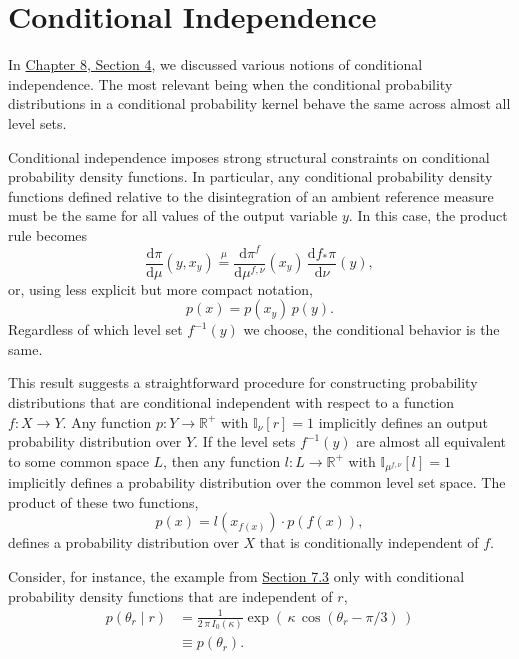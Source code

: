 \documentclass[
  letterpaper,
  DIV=11,
  numbers=noendperiod]{scrartcl}
\begin{document}
\section{Conditional Independence}\label{conditional-independence}

In
\href{http://www.symplectomorphic.com/assets/chapters_html/conditional_probability_theory.html\#sec:independence}{Chapter
8, Section 4}, we discussed various notions of conditional independence.
The most relevant being when the conditional probability distributions
in a conditional probability kernel behave the same across almost all
level sets.

Conditional independence imposes strong structural constraints on
conditional probability density functions. In particular, any
conditional probability density functions defined relative to the
disintegration of an ambient reference measure must be the same for all
values of the output variable \(y\). In this case, the product rule
becomes \[
\frac{ \mathrm{d}  \pi }{ \mathrm{d}  \mu  } (y, x_{y})
\overset{\mu}{=}
\frac{ \mathrm{d}  \pi^{f} }{ \mathrm{d}  \mu^{f, \nu}  } (x_{y}) \,
\frac{ \mathrm{d}  f_{*} \pi }{ \mathrm{d}  \nu  } (y),
\] or, using less explicit but more compact notation, \[
p(x) = p( x_{y} ) \, p(y).
\] Regardless of which level set \(f^{-1}(y)\) we choose, the
conditional behavior is the same.

This result suggests a straightforward procedure for constructing
probability distributions that are conditional independent with respect
to a function \(f : X \rightarrow Y\). Any function
\(p : Y \rightarrow \mathbb{R}^{+}\) with
\(\mathbb{I}_{\nu} \! \left[ r \right] = 1\) implicitly defines an
output probability distribution over \(Y\). If the level sets
\(f^{-1}(y)\) are almost all equivalent to some common space \(L\), then
any function \(l : L \rightarrow \mathbb{R}^{+}\) with
\(\mathbb{I}_{\mu^{f, \nu}} \! \left[ l \right] = 1\) implicitly defines
a probability distribution over the common level set space. The product
of these two functions, \[
p(x) = l( x_{f(x)} ) \cdot p( f(x) ),
\] defines a probability distribution over \(X\) that is conditionally
independent of \(f\).

Consider, for instance, the example from \hyperref[sec:build-ex]{Section
7.3} only with conditional probability density functions that are
independent of \(r\), \begin{align*}
p( \theta_{r} \mid r )
&=
\frac{1}{2 \, \pi \, I_{0}(\kappa) }
\exp( \, \kappa \, \cos( \theta_{r} - \pi / 3) \, )
\\
&\equiv
p( \theta_{r} ).
\end{align*}
\end{document}
